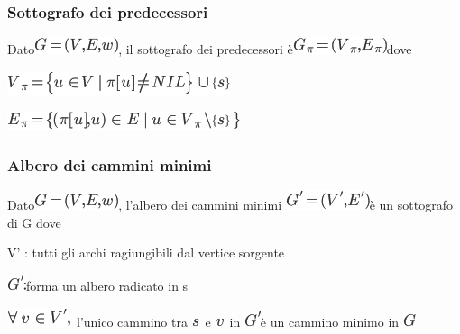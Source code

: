 \documentclass{article}
\begin{document}
\subsubsection{\texorpdfstring{{Sottografo dei
predecessori}}{Sottografo dei predecessori}}\label{h.ky1vo2u762au}

{Dato}\includegraphics{images/image510.png}{, il sottografo dei
predecessori è}\includegraphics{images/image511.png}{dove}

\includegraphics{images/image512.png}{~}

\includegraphics{images/image513.png}{~}

\subsubsection{\texorpdfstring{{Albero dei cammini
minimi}}{Albero dei cammini minimi}}\label{h.2lffyamho46s}

{Dato}\includegraphics{images/image510.png}{, l'albero dei cammini
minimi }\includegraphics{images/image514.png}{è un sottografo di G dove}

{V' : tutti gli archi ragiungibili dal vertice sorgente}

\includegraphics{images/image515.png}{forma un albero radicato in s}

\includegraphics{images/image516.png}{~l'unico cammino tra
}\includegraphics{images/image517.png}{~e
}\includegraphics{images/image76.png}{~in
}\includegraphics{images/image518.png}{è un cammino minimo in
}\includegraphics{images/image340.png}
\end{document}
